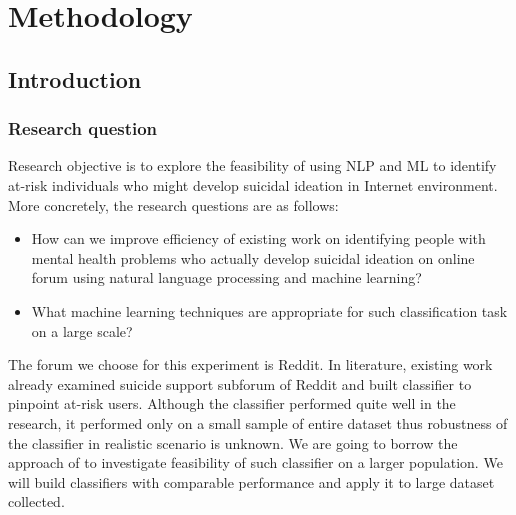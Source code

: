 
\chapter{Methodology}
	\label{chapter:methodology}%





\section{Introduction}
\subsection{Research question}
Research objective is to explore the feasibility of using NLP and ML to identify at-risk individuals who might develop suicidal ideation in Internet environment. More concretely, the research questions are as follows:
\begin{itemize}
\item How can we improve efficiency of existing work on identifying people with mental health problems who actually develop suicidal ideation on online forum using natural language processing and machine learning?
\item What machine learning techniques are appropriate for such classification task on a large scale?
\end{itemize}
The forum we choose for this experiment is Reddit. In literature, existing work \cite{DeChoudhury2016} already examined suicide support subforum of Reddit and built classifier to pinpoint at-risk users. Although the classifier performed quite well in the research, it performed only on a small sample of entire dataset thus robustness of the classifier in realistic scenario is unknown. We are going to borrow the approach of \cite{DeChoudhury2016} to investigate feasibility of such classifier on a larger population. We will build classifiers with comparable performance and apply it to large dataset collected.
